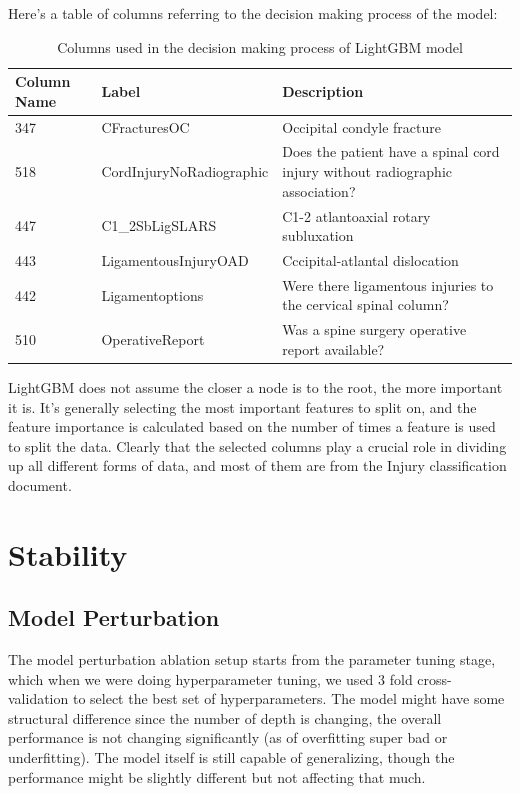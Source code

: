 \documentclass[10pt,letterpaper]{article}
\begin{document}
Here's a table of columns referring to the decision making process of the model:

\begin{table}[H]
    \centering
    \footnotesize
    \begin{tabular}{lll}
    \toprule
    \textbf{Column Name} & \textbf{Label} & \textbf{Description} \\
    \midrule
    347 & CFracturesOC & Occipital condyle fracture \\
    518 & CordInjuryNoRadiographic & Does the patient have a spinal cord injury without radiographic association?\\
    447 & C1\_2SbLigSLARS & C1-2 atlantoaxial rotary subluxation\\
    443 & LigamentousInjuryOAD & Cccipital-atlantal dislocation \\
    442 & Ligamentoptions & Were there ligamentous injuries to the cervical spinal column? \\ 
    510 & OperativeReport & Was a spine surgery operative report available? \\ 
    \bottomrule
    \end{tabular}
    \caption{Columns used in the decision making process of LightGBM model}%
\end{table}

LightGBM does not assume the closer a node is to the root, the more important it is. It's generally selecting the most important features to split on, and the feature importance is calculated based on the number of times a feature is used to split the data. Clearly that the selected columns play a crucial role in dividing up all different forms of data, and most of them are from the Injury classification document. 

\section{Stability}
\subsection{Model Perturbation}
The model perturbation ablation setup starts from the parameter tuning stage, which when we were doing hyperparameter tuning, we used 3 fold cross-validation to select the best set of hyperparameters. The model might have some structural difference since the number of depth is changing, the overall performance is not changing significantly (as of overfitting super bad or underfitting). The model itself is still capable of generalizing, though the performance might be slightly different but not affecting that much.
\end{document}
